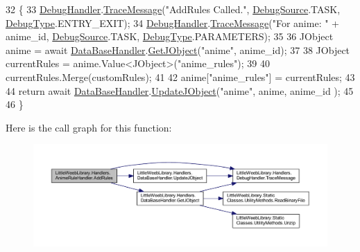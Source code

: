 \begin{DoxyCode}
32         \{
33             \mbox{\hyperlink{class_little_weeb_library_1_1_handlers_1_1_anime_rule_handler_a6ad89134d97d818f3b2deebb7e2cf361}{DebugHandler}}.\mbox{\hyperlink{interface_little_weeb_library_1_1_handlers_1_1_i_debug_handler_a2e405bc3492e683cd3702fae125221bc}{TraceMessage}}(\textcolor{stringliteral}{"AddRules Called."}, 
      \mbox{\hyperlink{namespace_little_weeb_library_1_1_handlers_a2a6ca0775121c9c503d58aa254d292be}{DebugSource}}.TASK, \mbox{\hyperlink{namespace_little_weeb_library_1_1_handlers_ab66019ed40462876ec4e61bb3ccb0a62}{DebugType}}.ENTRY\_EXIT);
34             \mbox{\hyperlink{class_little_weeb_library_1_1_handlers_1_1_anime_rule_handler_a6ad89134d97d818f3b2deebb7e2cf361}{DebugHandler}}.\mbox{\hyperlink{interface_little_weeb_library_1_1_handlers_1_1_i_debug_handler_a2e405bc3492e683cd3702fae125221bc}{TraceMessage}}(\textcolor{stringliteral}{"For anime: "} + anime\_id, 
      \mbox{\hyperlink{namespace_little_weeb_library_1_1_handlers_a2a6ca0775121c9c503d58aa254d292be}{DebugSource}}.TASK, \mbox{\hyperlink{namespace_little_weeb_library_1_1_handlers_ab66019ed40462876ec4e61bb3ccb0a62}{DebugType}}.PARAMETERS);
35 
36             JObject anime = await \mbox{\hyperlink{class_little_weeb_library_1_1_handlers_1_1_anime_rule_handler_a31322132913e3f4b669e14a3e621a326}{DataBaseHandler}}.\mbox{\hyperlink{interface_little_weeb_library_1_1_handlers_1_1_i_data_base_handler_a6586c4d1cfebdb8d5d40bc544d51914c}{GetJObject}}(\textcolor{stringliteral}{"anime"}, anime\_id);
37 
38             JObject currentRules = anime.Value<JObject>(\textcolor{stringliteral}{"anime\_rules"});
39 
40             currentRules.Merge(customRules);
41 
42             anime[\textcolor{stringliteral}{"anime\_rules"}] = currentRules;
43 
44             \textcolor{keywordflow}{return} await \mbox{\hyperlink{class_little_weeb_library_1_1_handlers_1_1_anime_rule_handler_a31322132913e3f4b669e14a3e621a326}{DataBaseHandler}}.\mbox{\hyperlink{interface_little_weeb_library_1_1_handlers_1_1_i_data_base_handler_a00c429576be33aa60bdf1a88edaf88c6}{UpdateJObject}}(\textcolor{stringliteral}{"anime"}, anime, anime\_id
      );
45 
46         \}
\end{DoxyCode}
Here is the call graph for this function\+:\nopagebreak
\begin{figure}[H]
\begin{center}
\leavevmode
\includegraphics[width=350pt]{class_little_weeb_library_1_1_handlers_1_1_anime_rule_handler_a469232c6b73d0ceff935c4ef2d78d039_cgraph}
\end{center}
\end{figure}
